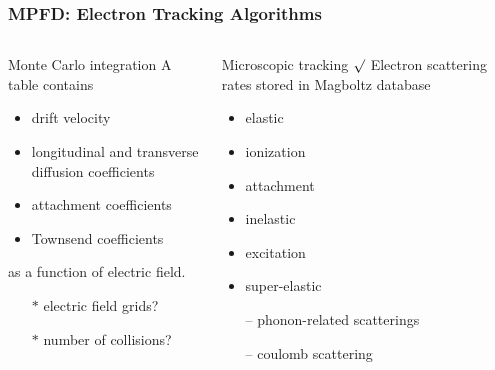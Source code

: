 \documentclass[fleqn]{beamer}
\begin{document}
 \begin{frame}
  \frametitle{MPFD: Electron Tracking Algorithms}
  \begin{columns}[c]
   \begin{column}{.5\textwidth}
    \begin{block}{Monte Carlo integration}
     A table contains
     \begin{itemize}
      \item drift velocity
      \item longitudinal and transverse diffusion coefficients
      \item attachment coefficients
      \item Townsend coefficients
     \end{itemize}
     as a function of electric field.
     
     
     \begin{itemize}
      \item[$\ast$] electric field grids?
      \item[$\ast$] number of collisions?
     \end{itemize}
    \end{block}
   \end{column}
   
   \begin{column}{.5\textwidth}
    \begin{block}{Microscopic tracking $\surd$}
    Electron scattering rates stored in Magboltz database
    \begin{itemize}
     \item elastic
     \item ionization
     \item attachment
     \item inelastic
     \item excitation
     \item super-elastic
     \item[--] phonon-related scatterings
     \item[--] coulomb scattering
    \end{itemize}

    \end{block}
   \end{column}


  \end{columns}

 \end{frame}
\end{document}

